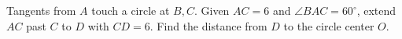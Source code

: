 Tangents from $A$ touch a circle at $B,C$. Given $AC=6$ and $\angle BAC=60^\circ$, extend $AC$ past $C$ to $D$ with $CD=6$. Find the distance from $D$ to the circle center $O$.
